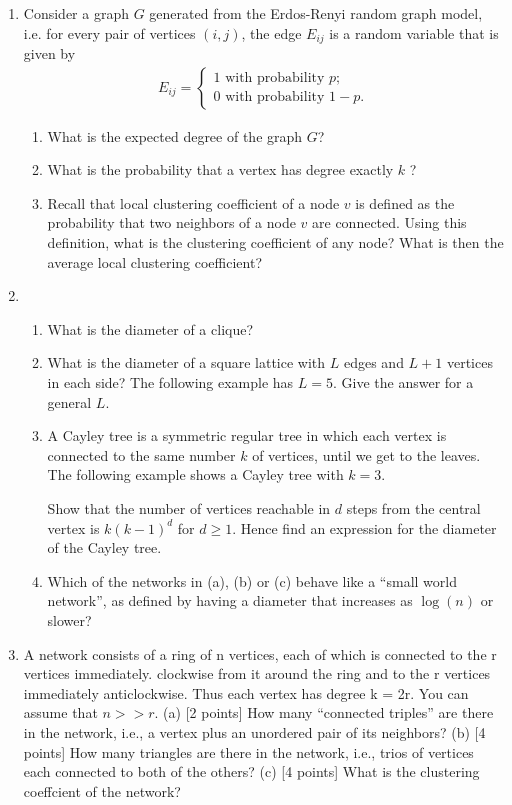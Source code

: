 \documentclass[a4paper,10pt]{article}
\begin{document}
\begin{enumerate}
\item Consider a graph $G$ generated from the Erdos-Renyi random graph model, 
i.e. for every pair of vertices $(i, j)$, the 
edge $E_{ij}$ is a random variable that is given by 
\begin{align*}
  E_{ij} = \begin{cases}
           1 \mbox{ with probability } p;\\
           0 \mbox{ with probability } 1 - p.
            \end{cases}
\end{align*}
\begin{enumerate}
 \item What is the expected degree of the graph $G$?
 \item What is the probability that a vertex has degree exactly $k$ ?
 \item Recall that local clustering coefficient of a node $v$ is defined as the probability that two neighbors of a node $v$ are connected. 
 Using this definition, what is the clustering coefficient of any node? What is then the average local clustering coefficient?
\end{enumerate}





\item 
\begin{enumerate}
\item What is the diameter of a clique?
\item What is the diameter of a square lattice with $L$ edges and $L+1$ vertices in each side? The following example has $L=5$.
Give the answer for a general $L$.
\vspace*{2in}

\item A Cayley tree is a symmetric regular tree in which each vertex is connected to the same number $k$ of vertices, 
until we get to the leaves. The following example shows a Cayley tree with $k = 3$. 
\vspace*{2in}

Show that the number of vertices reachable in $d$ steps from the central vertex is $k(k-1)^d$ for $d \ge 1$. 
Hence find an expression for the diameter of the Cayley tree. 

\item Which of the networks in (a), (b) or (c) behave like a ``small world network'', as defined by having a diameter
that increases as $\log(n)$ or slower?
\end{enumerate}

\item 
 A network consists of a ring of n vertices, each of which is connected to the r vertices immediately.
clockwise from it around the ring and to the r vertices immediately anticlockwise. Thus each
vertex has degree k = 2r. You can assume that $n >>r$.
(a) [2 points] How many “connected triples” are there in the network, i.e., a vertex plus an
unordered pair of its neighbors?
(b) [4 points] How many triangles are there in the network, i.e., trios of vertices each connected
to both of the others?
(c) [4 points] What is the clustering coeffcient of the network?


\end{enumerate}
\end{document}
